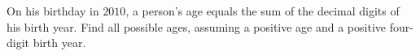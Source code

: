 On his birthday in $2010$, a person's age equals the sum of the decimal digits of his birth year. Find all possible ages, assuming a positive age and a positive four-digit birth year.
